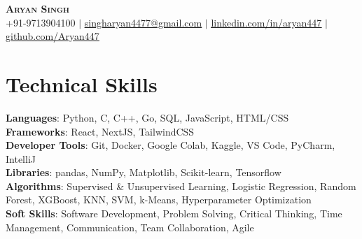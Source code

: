 \documentclass[letterpaper,11pt]{article}
\begin{document}

\begin{center}
    \textbf{\Huge \scshape Aryan Singh} \\ \vspace{1pt}
    \small +91-9713904100 $|$ \href{singharyan4477@gmail.com}{\underline{singharyan4477@gmail.com}} $|$
    \href{https://linkedin.com/in/aryan447/}{\underline{linkedin.com/in/aryan447}} $|$
    \href{https://github.com/Aryan447}{\underline{github.com/Aryan447}}
\end{center}

\section{Technical Skills}
 \begin{itemize}[leftmargin=0.15in, label={}]
    \small{\item{
     \textbf{Languages}{: Python, C, C++, Go, SQL, JavaScript, HTML/CSS} \\
     \textbf{Frameworks}{: React, NextJS, TailwindCSS} \\
     \textbf{Developer Tools}{: Git, Docker, Google Colab, Kaggle, VS Code, PyCharm, IntelliJ} \\
     \textbf{Libraries}{: pandas, NumPy, Matplotlib, Scikit-learn, Tensorflow}
    } \\
    \textbf{Algorithms}{: Supervised \& Unsupervised Learning, Logistic Regression, Random Forest, XGBoost, KNN, SVM, k-Means, Hyperparameter Optimization} \\
    \textbf{Soft Skills}{: Software Development, Problem Solving, Critical Thinking, Time Management, Communication, Team Collaboration, Agile}
  }
 \end{itemize}


\end{document}
